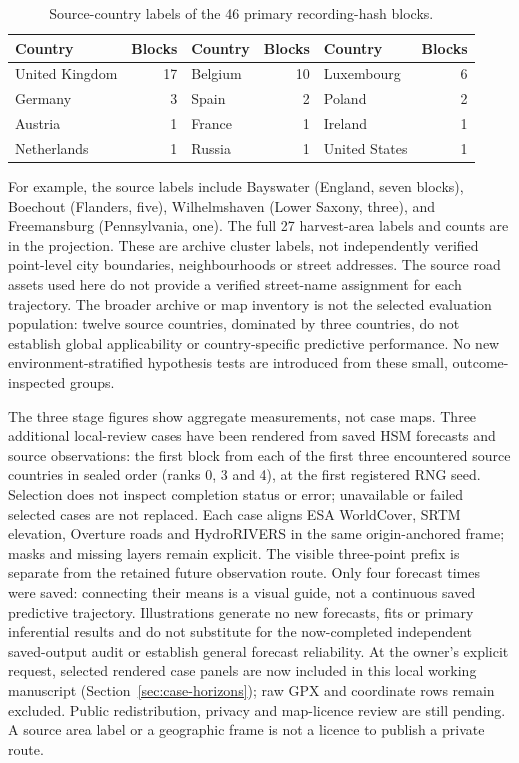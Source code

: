 \begin{table}[htbp]
\centering\small
\caption{Source-country labels of the 46 primary recording-hash blocks.}
\label{tab:geographic-blocks}\hypertarget{tab:geographic-blocks}{}
\begin{tabular}{lr lr lr}
\toprule
Country & Blocks & Country & Blocks & Country & Blocks\\
\midrule
United Kingdom & 17 & Belgium & 10 & Luxembourg & 6\\
Germany & 3 & Spain & 2 & Poland & 2\\
Austria & 1 & France & 1 & Ireland & 1\\
Netherlands & 1 & Russia & 1 & United States & 1\\
\bottomrule
\end{tabular}
\end{table}

For example, the source labels include Bayswater (England, seven blocks),
Boechout (Flanders, five), Wilhelmshaven (Lower Saxony, three), and
Freemansburg (Pennsylvania, one). The full 27 harvest-area labels and counts
are in the projection. These are archive cluster labels, not independently
verified point-level city boundaries, neighbourhoods or street addresses.
The source road assets used here do not provide a verified street-name
assignment for each trajectory. The broader archive or map inventory is not
the selected evaluation population: twelve source countries, dominated by
three countries, do not establish global applicability or country-specific
predictive performance. No new environment-stratified hypothesis tests are
introduced from these small, outcome-inspected groups.

The three stage figures show aggregate measurements, not case maps. Three
additional local-review cases have been rendered from saved HSM forecasts
and source observations: the first block from each of the first three
encountered source countries in sealed order (ranks 0, 3 and 4), at the first
registered RNG seed. Selection does not inspect completion status or error;
unavailable or failed selected cases are not replaced. Each case aligns ESA
WorldCover, SRTM elevation, Overture roads and HydroRIVERS in the same
origin-anchored frame; masks and missing layers remain explicit. The visible
three-point prefix is separate from the retained future observation route.
Only four forecast times were saved: connecting their means is a visual
guide, not a continuous saved predictive trajectory. Illustrations generate
no new forecasts, fits or primary inferential results and do not substitute
for the now-completed independent saved-output audit or establish general
forecast reliability. At the owner's explicit
request, selected rendered case panels are now included in this local working
manuscript (Section~\ref{sec:case-horizons}); raw GPX and coordinate rows
remain excluded. Public redistribution, privacy and map-licence review are
still pending. A source area label or a geographic frame is not a licence
to publish a private route.


